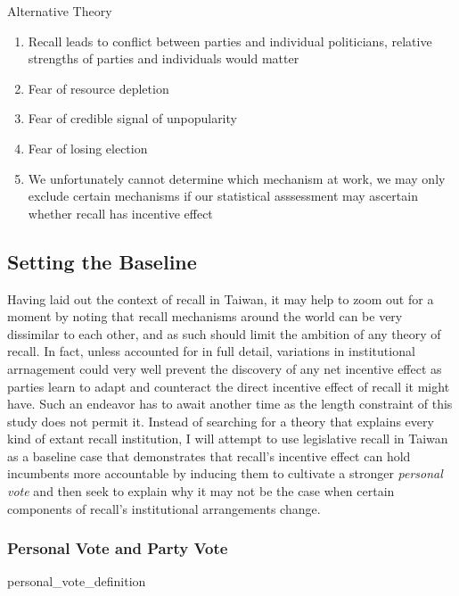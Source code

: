 \documentclass[hyphens, crop=false]{standalone}
\begin{document}
\begin{enumerate}
		Alternative Theory
		\begin{enumerate}
			\item 
			Recall leads to conflict between parties and individual politicians, relative strengths of parties and individuals would matter
			\item 
			Fear of resource depletion
			\item 
			Fear of credible signal of unpopularity
			\item 
			Fear of losing election
			\item 
			We unfortunately cannot determine which mechanism at work, we may only exclude certain mechanisms if our statistical asssessment may ascertain whether recall has incentive effect
		\end{enumerate}
	\end{enumerate}
	\newpage
	
	\subsection*{Setting the Baseline}
		Having laid out the context of recall in Taiwan,
		it may help to zoom out for a moment by noting that
		recall mechanisms around the world can be very dissimilar to each other,
		and as such should limit the ambition of any theory of recall.
		In fact,
		unless accounted for in full detail,
		variations in institutional arrnagement
		could very well prevent the discovery of any net incentive effect
		as parties learn to adapt and counteract the direct incentive effect of recall it might have.
		Such an endeavor has to await another time
		as the length constraint of this study does not permit it.
		Instead of searching for a theory that explains every kind of extant recall institution,
		I will attempt to use legislative recall in Taiwan as a baseline case that demonstrates
		that recall's incentive effect can hold incumbents more accountable
		by inducing them to cultivate a stronger \textit{personal vote}
		and then seek to explain why it may not be the case when
		certain components of recall's institutional arrangements change.
		\subsubsection*{Personal Vote and Party Vote}
		{personal_vote_definition}
		
\end{document}
